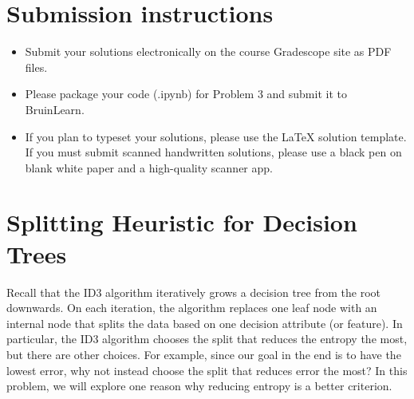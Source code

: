 \documentclass[11pt]{article}
\begin{document}
\author{}
\date{}
\vspace{-1in}
\maketitle
\vspace{-0.75in}
\newcommand \img[1]{\texttt{[image: \#1]}}





\ifsoln 
\else
\section*{Submission instructions}
\begin{itemize}
\item 
Submit your solutions electronically on the course Gradescope site as PDF files.
\item Please package your code (.ipynb) for Problem 3 and submit it to BruinLearn.
\item If you plan to typeset your solutions, please use the LaTeX solution template. If you must submit scanned handwritten solutions, please use a black pen on blank white paper and a high-quality scanner app.
\end{itemize}
\fi

\ifnotsolution{\newpage}



\section{Splitting Heuristic for Decision Trees }

Recall that the ID3 algorithm iteratively grows a decision tree from the root downwards. On each iteration, the algorithm replaces one leaf node with an internal node that splits the data based on one decision attribute (or feature). In particular, the ID3 algorithm chooses the split that reduces the entropy the most, but there are other choices. For example, since our goal in the end is to have the lowest error, why not instead choose the split that reduces error the most? In this problem, we will explore one reason why reducing entropy is a better criterion.
\end{document}
